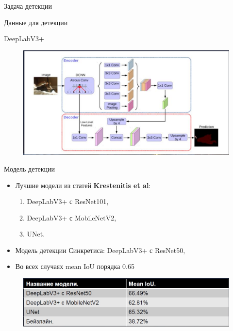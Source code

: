 \documentclass{beamer}
\begin{document}
\begin{section}{Задача детекции}
\begin{frame}{Данные для детекции}
\begin{itemize}
	\end{itemize}
	\end{frame}

\begin{frame}{DeepLabV3+}
\begin{figure}[H]
\centering
\includegraphics[scale=0.25]{deeplabv3plus.png}
\end{figure}
\end{frame}

\begin{frame}{Модель детекции}
	\begin{itemize}
		\item Лучшие модели из статей \textbf{Krestenitis et al}:
		\begin{enumerate}
			\item DeepLabV3+ с ResNet101,
			\item DeepLabV3+ с MobileNetV2,
			\item UNet.
		\end{enumerate}
	    \item Модель детекции Синкретиса:
	    DeepLabV3+ с ResNet50,
	    \item Во всех случаях mean IoU порядка 0.65
	\end{itemize}

\begin{figure}[H]
	\centering
	\includegraphics[scale=0.4]{table_of_syncretis_results.png}
\end{figure}

\end{frame}


\end{section}
\end{document}
